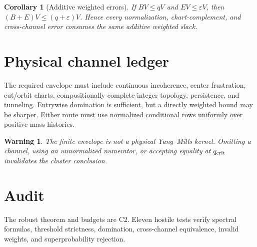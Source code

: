 \documentclass[11pt]{article}
\newtheorem{corollary}{Corollary}
\newtheorem{warning}{Warning}
\begin{document}
\begin{corollary}[Additive weighted errors]
If $BV\leq qV$ and $EV\leq\varepsilon V$, then
$(B+E)V\leq(q+\varepsilon)V$.  Hence every normalization, chart-complement,
and cross-channel error consumes the same additive weighted slack.
\end{corollary}

\section{Physical channel ledger}
The required envelope must include continuous incoherence, center frustration,
cut/orbit charts, compositionally complete integer topology, persistence, and
tunneling.  Entrywise domination is sufficient, but a directly weighted bound
may be sharper.  Either route must use normalized conditional rows uniformly
over positive-mass histories.

\begin{warning}
The finite envelope is not a physical Yang--Mills kernel.  Omitting a channel,
using an unnormalized numerator, or accepting equality at $q_{\rm crit}$
invalidates the cluster conclusion.
\end{warning}

\section{Audit}
The robust theorem and budgets are C2.  Eleven hostile tests verify spectral
formulas, threshold strictness, domination, cross-channel equivalence, invalid
weights, and superprobability rejection.
\end{document}
